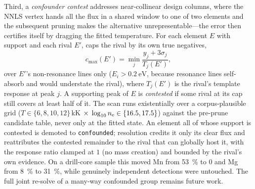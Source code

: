 Third, a \emph{confounder contest} addresses near-collinear design columns, where the
NNLS vertex hands all the flux in a shared window to one of two elements and the
subsequent pruning makes the alternative unrepresentable---the error then certifies
itself by dragging the fitted temperature. For each element $E$ with support and each
rival $E'$, \alibz{} caps the rival by its own true negatives,
%
\begin{equation}
  \label{eq:contest}
  c_\mathrm{max}(E') =
    \min_j \frac{y_j + 3\sigma_j}{T_j(E')},
\end{equation}
%
over $E'$'s non-resonance lines only ($E_i>\SI{0.2}{\electronvolt}$, because resonance
lines self-absorb and would understate the rival), where $T_j(E')$ is the rival's
template response at peak $j$. A supporting peak of $E$ is \emph{contested} if some
rival at its cap still covers at least half of it. The scan runs existentially over a
corpus-plausible grid ($T\in\{6,8,10,12\}$\,kK $\times\;\log_{10}n_{\mathrm{e}}\in\{16.5,17.5\}$)
against the pre-prune candidate table, never only at the fitted state. An element all
of whose support is contested is demoted to \texttt{confounded}; resolution credits it
only its clear flux and reattributes the contested remainder to the rival that can
globally host it, with the response ratio clamped at $1$ (no mass creation) and bounded
by the rival's own evidence. On a drill-core sample this moved Mn from
\SI{53}{\percent} to $0$ and Mg from \SI{8}{\percent} to \SI{31}{\percent}, while
genuinely independent detections were untouched. The full joint re-solve of a many-way
confounded group remains future work.
